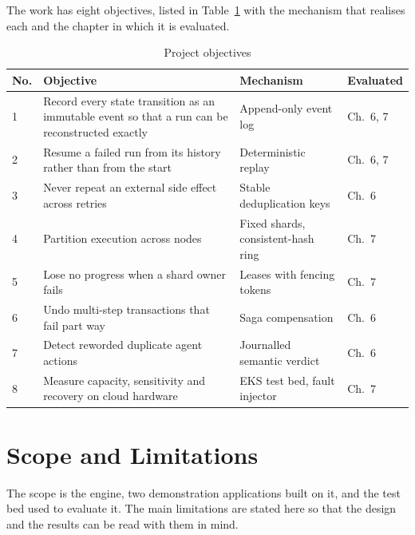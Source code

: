 The work has eight objectives, listed in Table~\ref{tab:objectives} with the
mechanism that realises each and the chapter in which it is evaluated.

\begin{table}[htbp]
  \centering
  \caption{Project objectives}
  \label{tab:objectives}
  \small
  \begin{tabular}{|p{0.19in}|p{2.58in}|p{1.55in}|p{0.70in}|}
    \hline
    \textbf{No.} & \textbf{Objective} & \textbf{Mechanism} & \textbf{Evaluated} \\
    \hline
    1 & Record every state transition as an immutable event so that a run can
        be reconstructed exactly & Append-only event log & Ch.~6, 7 \\
    \hline
    2 & Resume a failed run from its history rather than from the start &
        Deterministic replay & Ch.~6, 7 \\
    \hline
    3 & Never repeat an external side effect across retries & Stable
        deduplication keys & Ch.~6 \\
    \hline
    4 & Partition execution across nodes & Fixed shards, consistent-hash
        ring & Ch.~7 \\
    \hline
    5 & Lose no progress when a shard owner fails & Leases with fencing
        tokens & Ch.~7 \\
    \hline
    6 & Undo multi-step transactions that fail part way & Saga
        compensation & Ch.~6 \\
    \hline
    7 & Detect reworded duplicate agent actions & Journalled semantic
        verdict & Ch.~6 \\
    \hline
    8 & Measure capacity, sensitivity and recovery on cloud hardware & EKS
        test bed, fault injector & Ch.~7 \\
    \hline
  \end{tabular}
\end{table}

\section{Scope and Limitations}

The scope is the engine, two demonstration applications built on it, and the
test bed used to evaluate it. The main limitations are stated here so that the
design and the results can be read with them in mind.

